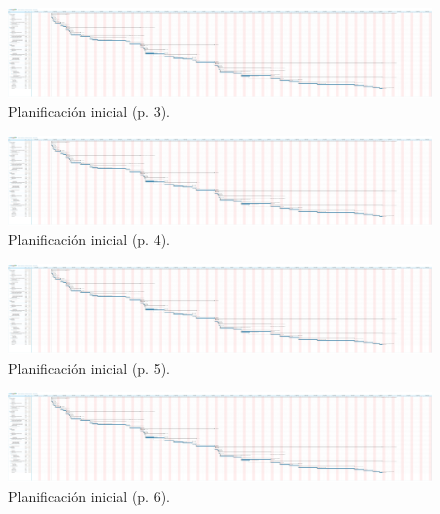 \begin{figure}
 \centering
 \includegraphics[trim=61cm 5cm 149cm 0,clip=true,scale=0.45,keepaspectratio=true]{./imagenes/planificacion-inicial.png}
 \caption{Planificación inicial (p. 3).}
 \label{figura:PlanificacionInicialCompleta3}
\end{figure}

\begin{figure}
 \centering
 \includegraphics[trim=93cm 5cm 117cm 0,clip=true,scale=0.45,keepaspectratio=true]{./imagenes/planificacion-inicial.png}
 \caption{Planificación inicial (p. 4).}
 \label{figura:PlanificacionInicialCompleta4}
\end{figure}

\begin{figure}
 \centering
 \includegraphics[trim=125cm 5cm 85cm 0,clip=true,scale=0.45,keepaspectratio=true]{./imagenes/planificacion-inicial.png}
 \caption{Planificación inicial (p. 5).}
 \label{figura:PlanificacionInicialCompleta5}
\end{figure}

\begin{figure}
 \centering
 \includegraphics[trim=157cm 5cm 53cm 0,clip=true,scale=0.45,keepaspectratio=true]{./imagenes/planificacion-inicial.png}
 \caption{Planificación inicial (p. 6).}
 \label{figura:PlanificacionInicialCompleta6}
\end{figure}

